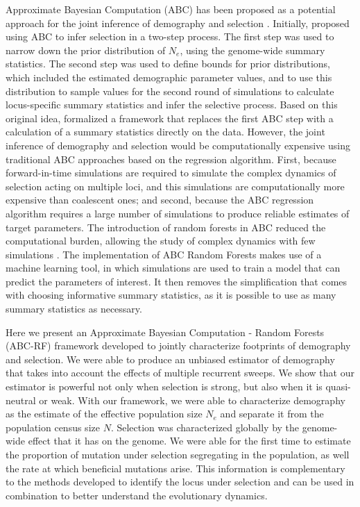 \documentclass[12pt]{article}
\begin{document}
Approximate Bayesian Computation (ABC) has been proposed as a potential approach for the joint inference of demography and selection \citep{Li:2012bh}. Initially, \citet{Bazin:2010dv} proposed using ABC to infer selection in a two-step process. The first step was used to narrow down the prior distribution of $N_{e}$, using the genome-wide summary statistics. The second step was used to define bounds for prior distributions, which included the estimated demographic parameter values, and to use this distribution to sample values for the second round of simulations to calculate locus-specific summary statistics and infer the selective process. Based on this original idea, \citet{Foll:2014kv, Foll:2015ce} formalized a framework that replaces the first ABC step with a calculation of a summary statistics directly on the data. However, the joint inference of demography and selection would be computationally expensive using traditional ABC approaches based on the regression algorithm. First, because forward-in-time simulations are required to simulate the complex dynamics of selection acting on multiple loci, and this simulations are computationally more expensive than coalescent ones; and second, because the ABC regression algorithm requires a large number of simulations to produce reliable estimates of target parameters. The introduction of random forests in ABC reduced the computational burden, allowing the study of complex dynamics with few simulations \citep{Pudlo:2016il, Raynal:2017wm}. The implementation of ABC Random Forests makes use of a machine learning tool, in which simulations are used to train a model that can predict the parameters of interest. It then removes the simplification that comes with choosing informative summary statistics, as it is possible to use as many summary statistics as necessary. 

Here we present an Approximate Bayesian Computation - Random Forests (ABC-RF) framework developed to jointly characterize footprints of demography and selection. We were able to produce an unbiased estimator of demography that takes into account the effects of multiple recurrent sweeps. We show that our estimator is powerful not only when selection is strong, but also when it is quasi-neutral or weak. With our framework, we were able to characterize demography as the estimate of the effective population size $N_{e}$ and separate it from the population census size $N$. Selection was characterized globally by the genome-wide effect that it has on the genome. We were able for the first time to estimate the proportion of mutation under selection segregating in the population, as well the rate at which beneficial mutations arise. This information is complementary to the methods developed to identify the locus under selection and can be used in combination to better understand the evolutionary dynamics.
\end{document}
